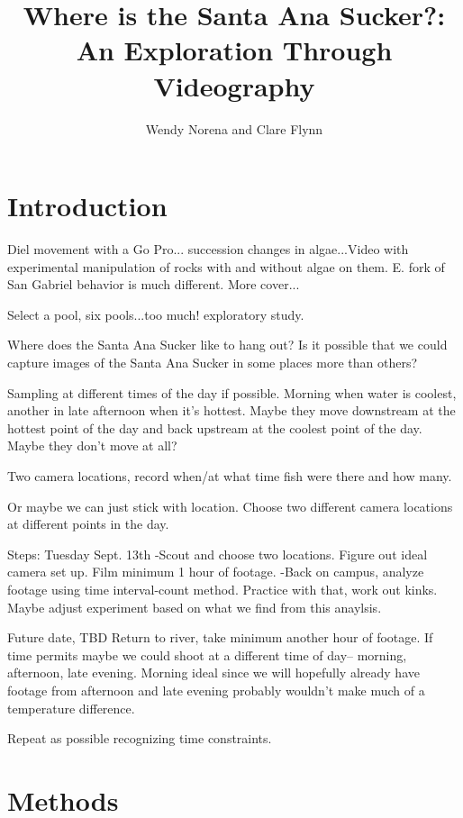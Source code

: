 \documentclass{tufte-handout}\usepackage[]{graphicx}\usepackage[]{color}
\title{Where is the Santa Ana Sucker?: An Exploration Through Videography}
\author{Wendy Norena and Clare Flynn}
\begin{document}

\maketitle

\section{Introduction}


  Diel movement with a Go Pro... succession changes in algae...Video with experimental manipulation of rocks with and without algae on them. E. fork of San Gabriel behavior is much different. More cover...
  
  Select a pool, six pools...too much!  exploratory study.
  
  
Where does the Santa Ana Sucker like to hang out? Is it possible that we could capture images of the Santa Ana Sucker in some places more than others?


Sampling at different times of the day if possible. Morning when water is coolest, another in late afternoon when it's hottest. Maybe they move downstream at the hottest point of the day and back upstream at the coolest point of the day. Maybe they don't move at all?

Two camera locations, record when/at what time fish were there and how many. 


Or maybe we can just stick with location. Choose two different camera locations at different points in the day. 


Steps:
Tuesday Sept. 13th
-Scout and choose two locations. Figure out ideal camera set up. Film minimum 1 hour of footage.
-Back on campus, analyze footage using time interval-count method. Practice with that, work out kinks. Maybe adjust experiment based on what we find from this anaylsis.

Future date, TBD
Return to river, take minimum another hour of footage. If time permits maybe we could shoot at a different time of day-- morning, afternoon, late evening. Morning ideal since we will hopefully already have footage from afternoon and late evening probably wouldn't make much of a temperature difference. 

Repeat as possible recognizing time constraints.

\section{Methods}
\end{document}
